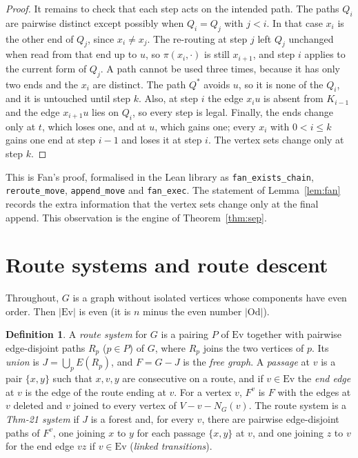 \documentclass[11pt]{amsart}
\theoremstyle{definition}
\newtheorem{definition}[theorem]{Definition}
\newcommand{\Ev}{\mathrm{Ev}}
\newcommand{\Od}{\mathrm{Od}}
\begin{document}
\begin{proof}
It remains to check that each step acts on the intended path. The paths $Q_i$ are pairwise distinct
except possibly when $Q_i=Q_j$ with $j<i$. In that case $x_i$ is the other end of $Q_j$, since
$x_i\neq x_j$. The re-routing at step $j$ left $Q_j$ unchanged when read from that end up to $u$, so
$\pi(x_i,\cdot)$ is still $x_{i+1}$, and step $i$ applies to the current form of $Q_j$. A path cannot be
used three times, because it has only two ends and the $x_i$ are distinct. The path $Q^\ast$ avoids $u$,
so it is none of the $Q_i$, and it is untouched until step $k$. Also, at step $i$ the edge $x_iu$ is
absent from $K_{i-1}$ and the edge $x_{i+1}u$ lies on $Q_i$, so every step is legal. Finally, the ends
change only at $t$, which loses one, and at $u$, which gains one; every $x_i$ with $0<i\le k$ gains one
end at step $i-1$ and loses it at step $i$. The vertex sets change only at step $k$.
\end{proof}

This is Fan's proof, formalised in the Lean library as \texttt{fan\_exists\_chain},
\texttt{reroute\_move}, \texttt{append\_move} and \texttt{fan\_exec}. The statement of
Lemma~\ref{lem:fan} records the extra information that the vertex sets change only at the final
append. This observation is the engine of Theorem~\ref{thm:sep}.

\section{Route systems and route descent}\label{sec:descent}

Throughout, $G$ is a graph without isolated vertices whose components have even order. Then $|\Ev|$ is
even (it is $n$ minus the even number $|\Od|$).

\begin{definition}\label{def:routes}
A \emph{route system} for $G$ is a pairing $P$ of $\Ev$ together with pairwise edge-disjoint paths
$R_p$ ($p\in P$) of $G$, where $R_p$ joins the two vertices of $p$. Its \emph{union} is
$J=\bigcup_pE(R_p)$, and $F=G-J$ is the \emph{free graph}. A \emph{passage} at $v$ is a pair $\{x,y\}$ such
that $x,v,y$ are consecutive on a route, and if $v\in\Ev$ the \emph{end edge} at $v$ is the edge of the
route ending at $v$. For a vertex $v$, $F^v$ is $F$ with the edges at $v$ deleted and $v$ joined to every
vertex of $V-v-N_G(v)$. The route system is a \emph{Thm-21 system} if $J$ is a forest and, for every $v$,
there are pairwise edge-disjoint paths of $F^v$, one joining $x$ to $y$ for each passage $\{x,y\}$ at $v$,
and one joining $z$ to $v$ for the end edge $vz$ if $v\in\Ev$ (\emph{linked transitions}).
\end{definition}
\end{document}
